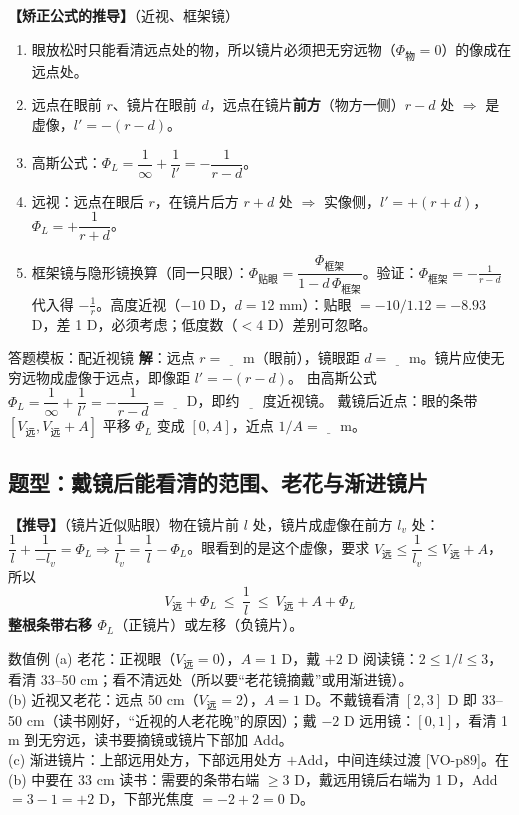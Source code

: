 \textbf{【矫正公式的推导】}（近视、框架镜）
\begin{enumerate}
\item 眼放松时只能看清远点处的物，所以镜片必须把无穷远物（$\Phi_{\text{物}}=0$）的像成在远点处。
\item 远点在眼前 $r$、镜片在眼前 $d$，远点在镜片\textbf{前方}（物方一侧）$r-d$ 处 $\Rightarrow$ 是虚像，$l'=-(r-d)$。
\item 高斯公式：$\Phi_L=\dfrac1\infty+\dfrac1{l'}=-\dfrac{1}{r-d}$。
\item 远视：远点在眼后 $r$，在镜片后方 $r+d$ 处 $\Rightarrow$ 实像侧，$l'=+(r+d)$，$\Phi_L=+\dfrac{1}{r+d}$。
\item 框架镜与隐形镜换算（同一只眼）：$\Phi_{\text{贴眼}}=\dfrac{\Phi_{\text{框架}}}{1-d\,\Phi_{\text{框架}}}$。验证：$\Phi_{\text{框架}}=-\frac1{r-d}$ 代入得 $-\frac1r$。高度近视（$-10$ D，$d=12$ mm）：贴眼 $=-10/1.12=-8.93$ D，差 1 D，必须考虑；低度数（$<4$ D）差别可忽略。
\end{enumerate}

\begin{exam}{答题模板：配近视镜}
\textbf{解}：远点 $r=\underline{\quad}$ m（眼前），镜眼距 $d=\underline{\quad}$ m。镜片应使无穷远物成虚像于远点，即像距 $l'=-(r-d)$。
由高斯公式 $\Phi_L=\dfrac1\infty+\dfrac1{l'}=-\dfrac1{r-d}=\underline{\quad}$ D，即约 $\underline{\quad}$ 度近视镜。
戴镜后近点：眼的条带 $[V_{\text{远}},V_{\text{远}}+A]$ 平移 $\Phi_L$ 变成 $[0,A]$，近点 $1/A=\underline{\quad}$ m。
\end{exam}

\subsection{题型：戴镜后能看清的范围、老花与渐进镜片}\label{sec:presby}
\textbf{【推导】}（镜片近似贴眼）物在镜片前 $l$ 处，镜片成虚像在前方 $l_v$ 处：$\dfrac1l+\dfrac1{-l_v}=\Phi_L\Rightarrow\dfrac1{l_v}=\dfrac1l-\Phi_L$。眼看到的是这个虚像，要求 $V_{\text{远}}\le\dfrac1{l_v}\le V_{\text{远}}+A$，所以
\[
\boxed{V_{\text{远}}+\Phi_L\ \le\ \frac1l\ \le\ V_{\text{远}}+A+\Phi_L}
\]
\textbf{整根条带右移 $\Phi_L$}（正镜片）或左移（负镜片）。

\begin{exam}{数值例}
(a) 老花：正视眼（$V_{\text{远}}=0$），$A=1$ D，戴 $+2$ D 阅读镜：$2\le1/l\le3$，看清 33–50 cm；看不清远处（所以要“老花镜摘戴”或用渐进镜）。\\
(b) 近视又老花：远点 50 cm（$V_{\text{远}}=2$），$A=1$ D。不戴镜看清 $[2,3]$ D 即 33–50 cm（读书刚好，“近视的人老花晚”的原因）；戴 $-2$ D 远用镜：$[0,1]$，看清 1 m 到无穷远，读书要摘镜或镜片下部加 Add。\\
(c) 渐进镜片：上部远用处方，下部远用处方 $+$Add，中间连续过渡 [VO-p89]。在 (b) 中要在 33 cm 读书：需要的条带右端 $\ge3$ D，戴远用镜后右端为 1 D，Add $=3-1=+2$ D，下部光焦度 $=-2+2=0$ D。
\end{exam}

